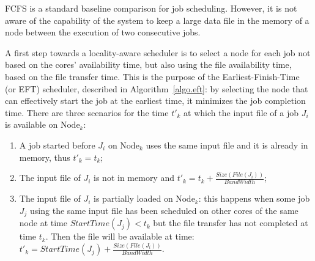 \documentclass[conference,10pt]{IEEEtran}
\newcommand{\Node}[1]{\ensuremath{\mathrm{Node}_{#1}}\xspace}
\newcommand{\file}{\ensuremath{\mathit{File}}\xspace}
\newcommand{\size}{\ensuremath{\mathit{Size}}\xspace}
\newcommand{\bandwidth}{\mathit{BandWidth}\xspace}
\newcommand{\start}{\mathit{StartTime}\xspace}
\begin{document}
FCFS is a standard baseline comparison
for job scheduling. However, it is not aware of the capability of the
system to keep a large data file in the memory of a node between the execution of
two consecutive jobs.

A first step towards a locality-aware scheduler
is to select a node for each job not based on the cores' availability
time, but also using the file availability time, based on the file
transfer time. This is the purpose of the Earliest-Finish-Time (or
EFT) scheduler, described in Algorithm~\ref{algo.eft}: by selecting
the node that can effectively start the job at the earliest time, it
minimizes the job completion time. There are three scenarios for the
time $t'_k$ at which the input file of a job $J_i$ is available on
\Node{k}:
\begin{enumerate}
\item A job started before $J_i$ on \Node{k} uses the same input
  file and it is already in memory, thus $t'_k=t_k$;
\item The input file of $J_i$ is not in memory and
  $t'_k=t_k+\frac{\size(\file(J_i))}{\bandwidth}$;
\item The input file of $J_i$ is partially loaded on \Node{k}: this
  happens when some
  job $J_j$ using the same input file has been scheduled on other cores of
  the same node at time $\start(J_j)<t_k$ but the file transfer has not
  completed at time $t_k$. Then the file will be available at time:
  $t'_k = \start(J_j)+\frac{\size(\file(J_i))}{\bandwidth}.$
\end{enumerate}


		
\end{document}
